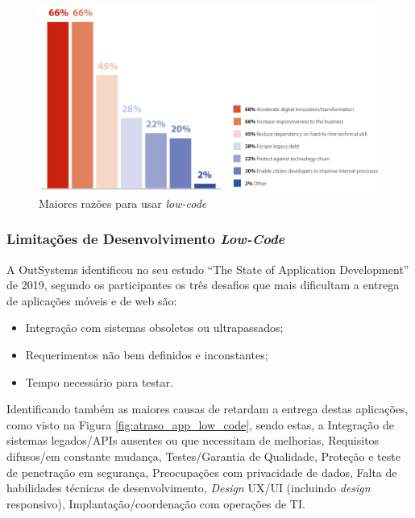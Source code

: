             \begin{figure}[htbp]
                \centering
                \includegraphics[width=\textwidth]{imgs/reasons_to_use_low-code.png}
                    \caption{Maiores razões para usar \textit{low-code}}\label{fig:reasons_to_use_low-code}
            \end{figure}

        \subsubsection{Limitações de Desenvolvimento \textit{Low-Code}}\label{secsec:limitacoes_low-code}

            A OutSystems identificou no seu estudo ``The State of Application Development'' de 2019, segundo os participantes os três desafios que mais dificultam a entrega de aplicações móveis e de web são:
            \begin{itemize}
                \item Integração com sistemas obsoletos ou ultrapassados;
                \item Requerimentos não bem definidos e inconstantes;
                \item Tempo necessário para testar.
            \end{itemize}
                
            Identificando também as maiores causas de retardam a entrega destas aplicações, como visto na Figura \ref{fig:atraso_app_low_code}, sendo estas, a Integração de sistemas legados/APIs ausentes ou que necessitam de melhorias, Requisitos difusos/em constante mudança, Testes/Garantia de Qualidade, Proteção e teste de penetração em segurança, Preocupações com privacidade de dados, Falta de habilidades técnicas de desenvolvimento, \textit{Design} UX/UI (incluindo \textit{design} responsivo), Implantação/coordenação com operações de TI\cite{state-of-lowcode-outsystems}.
                
